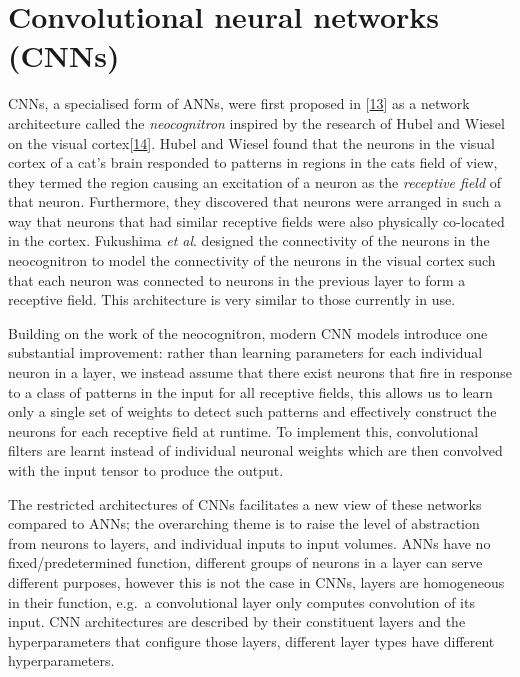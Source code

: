 \documentclass[A4paper,draft]{scrreprt}
\newcommand{\etal}{\textit{et al}.}
\begin{document}
\section{Convolutional neural networks
(CNNs)}\label{sec:background:cnns}

CNNs, a specialised form of ANNs, were first proposed in
{[}\protect\hyperlink{ref-fukushima1980_Neocognitronselforganizingneural}{13}{]}
as a network architecture called the \emph{neocognitron} inspired by the
research of Hubel and Wiesel on the visual
cortex{[}\protect\hyperlink{ref-hubel1959_Receptivefieldssingle}{14}{]}.
Hubel and Wiesel found that the neurons in the visual cortex of a cat's
brain responded to patterns in regions in the cats field of view, they
termed the region causing an excitation of a neuron as the
\emph{receptive field} of that neuron. Furthermore, they discovered that
neurons were arranged in such a way that neurons that had similar
receptive fields were also physically co-located in the cortex.
Fukushima \etal{} designed the connectivity of the neurons in the
neocognitron to model the connectivity of the neurons in the visual
cortex such that each neuron was connected to neurons in the previous
layer to form a receptive field. This architecture is very similar to
those currently in use.

Building on the work of the neocognitron, modern CNN models introduce
one substantial improvement: rather than learning parameters for each
individual neuron in a layer, we instead assume that there exist neurons
that fire in response to a class of patterns in the input for all
receptive fields, this allows us to learn only a single set of weights
to detect such patterns and effectively construct the neurons for each
receptive field at runtime. To implement this, convolutional filters are
learnt instead of individual neuronal weights which are then convolved
with the input tensor to produce the output.

The restricted architectures of CNNs facilitates a new view of these
networks compared to ANNs; the overarching theme is to raise the level
of abstraction from neurons to layers, and individual inputs to input
volumes. ANNs have no fixed/predetermined function, different groups of
neurons in a layer can serve different purposes, however this is not the
case in CNNs, layers are homogeneous in their function, e.g.~a
convolutional layer only computes convolution of its input. CNN
architectures are described by their constituent layers and the
hyperparameters that configure those layers, different layer types have
different hyperparameters.
\end{document}
